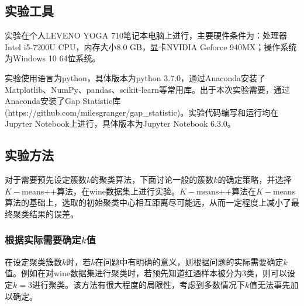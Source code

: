 \documentclass[12pt]{article}
\begin{document}
\subsection{实验工具}
实验在个人LEVENO YOGA 710笔记本电脑上进行，主要硬件条件为：处理器Intel i5-7200U CPU，内存大小8.0 GB，显卡NVIDIA Geforce 940MX；操作系统为Windows 10 64位系统。\par 
实验使用语言为python，具体版本为python 3.7.0，通过Anaconda安装了Matplotlib、NumPy、pandas、scikit-learn等常用库。出于本次实验需要，通过Anaconda安装了Gap Statistic库(https://github.com/milesgranger/gap\_statistic)。实验代码编写和运行均在Jupyter Notebook上进行，具体版本为Jupyter Notebook 6.3.0。
\vbox{}
\subsection{实验方法}
对于需要预先设定簇数$k$的聚类算法，下面讨论一般的簇数$k$的确定策略，并选择$K-$means++算法，在wine数据集上进行实验。$K-$means++算法在$K-$means算法的基础上，选取的初始聚类中心相互距离尽可能远，从而一定程度上减小了最终聚类结果的误差。
\subsubsection{根据实际需要确定$k$值}
在设定聚类簇数$k$时，若$k$在问题中有明确的意义，则根据问题的实际需要确定$k$值。例如在对wine数据集进行聚类时，若预先知道红酒样本被分为3类，则可以设定$k=3$进行聚类。该方法有很大程度的局限性，考虑到多数情况下$k$值无法事先加以确定。
\end{document}
